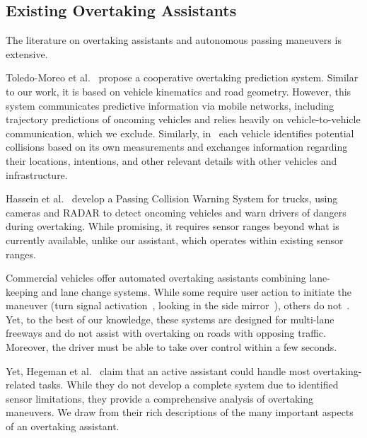 	
	\subsection{Existing Overtaking Assistants}\label{subsec:existing-assis}
	
	The literature on overtaking assistants and autonomous passing maneuvers is extensive.
	
	Toledo-Moreo et al.~\cite{Toledo2009} propose a cooperative overtaking prediction system. 
	Similar to our work, it is based on vehicle kinematics and road geometry. 
	However, this system communicates predictive information via mobile networks, including trajectory predictions of oncoming vehicles and relies heavily on vehicle-to-vehicle communication, which we exclude.
	Similarly, in~\cite{Han-Shue2006} each vehicle identifies potential collisions based on its own measurements and exchanges information regarding their locations, intentions, and other relevant details with other vehicles and infrastructure. 
	
	
	Hassein et al.~\cite{Hassein2019} develop a Passing Collision Warning System for trucks, using cameras and RADAR to detect oncoming vehicles and warn drivers of dangers during overtaking. 
	While promising, it requires sensor ranges beyond what is currently available, unlike our assistant, which operates within existing sensor ranges.
	
	
	
	
	Commercial vehicles offer automated overtaking assistants combining lane-keeping and lane change systems. 
	While some require user action to initiate the maneuver (turn signal activation~\cite{web:tesla:autopilot}, %
    looking in the side mirror~\cite{web:usatoday-bmw}), %
    others do not~\cite{web:mercedes-benz-scottsdale}. %
	Yet, to the best of our knowledge, these systems are designed for multi-lane freeways and do not assist with overtaking on roads with opposing traffic.
	Moreover, the driver must be able to take over control within a few seconds.
	


Yet, Hegeman et al.~\cite{Hegeman_Brookhuis_Hoogendoorn_2005} claim that an active assistant could handle most overtaking-related tasks. 
While they do not develop a complete system due to identified sensor limitations, they provide a comprehensive analysis of overtaking maneuvers.
We draw from their rich descriptions of the many important aspects of an overtaking assistant. 



